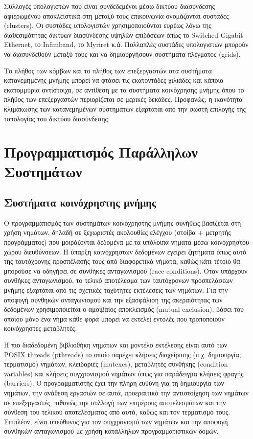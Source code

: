 Συλλογές υπολογιστών που είναι συνδεδεμένοι μέσω δικτύου διασύνδεσης αφιερωμένου αποκλειστικά στη μεταξύ τους επικοινωνία ονομάζονται συστάδες (clusters). Οι συστάδες υπολογιστών χρησιμοποιούνται ευρέως λόγω της διαθεσιμότητας δικτύων διασύνδεσης υψηλών επιδόσεων όπως το Switched Gigabit Ethernet, το Infiniband, το Myriret κ.ά. Πολλαπλές συστάδες υπολογιστών μπορούν να διασυνδεθούν μεταξύ τους και να δημιουργήσουν συστήματα πλέγματος (grids).

Το πλήθος των κόμβων και το πλήθος των επεξεργαστών στα συστήματα κατανεμημένης μνήμης μπορεί να φτάσει τις εκατοντάδες χιλιάδες και κάποια εκατομμύρια αντίστοιχα, σε αντίθεση με τα συστήματα κοινόχρησης μνήμης όπου το πλήθος των επεξεργαστών περιορίζεται σε μερικές δεκάδες. Προφανώς, η ικανότητα κλιμάκωσης των κατανεμημένων συστημάτων εξαρτάται από την σωστή επιλογής της τοπολογίας του δικτύου διασύνδεσης.


\section{Προγραμματισμός Παράλληλων Συστημάτων}

\subsection{Συστήματα κοινόχρηστης μνήμης}
\label{ssec:Shared Memory Programming}
Ο προγραμματισμός των συστημάτων κοινόχρηστης μνήμης συνήθως βασίζεται στη χρήση νημάτων, δηλαδή σε ξεχωριστές ακολουθίες ελέγχου (στοίβα + μετρητής προγράμματος) που μοιράζονται δεδομένα με τα υπόλοιπα  νήματα μέσω κοινόχρηστου χώρου διευθύνσεων. Η ύπαρξη κοινόχρηστων δεδομένων εγείρει ζητήματα όπως αυτό της ταυτόχρονης προσπέλασής τους από διαφορετικά νήματα, καθώς κάτι τέτοιο θα μπορούσε να οδηγήσει σε συνθήκες ανταγωνισμού (race conditions). Όταν υπάρχουν συνθήκες ανταγωνισμού, το τελικό αποτέλεσμα των ταυτόχρονων προσπελάσεων μνήμης εξαρτάται από τις σχετικές ταχύτητες εκτέλεσεις των νημάτων. Για την αποφυγή συνθηκών ανταγωνισμού και την εξασφάλιση της ακεραιότητας των δεδομένων χρησιμοποιείται ο αμοιβαίος αποκλεισμός (mutual exclusion), βάσει του οποίου μόνο ένα νήμα κάθε φορά μπορεί να εκτελεί εντολές που τροποποιούν κοινόχρηστες μεταβλητές.

Η πιο διαδεδομένη βιβλιοθήκη νημάτων και μοντέλο εκτέλεσης είναι αυτό των POSIX threads (pthreads) το οποίο παρέχει κλήσεις διαχείρισης (π.χ. δημιουργία, τερματισμό) νημάτων, κλειδαριές (mutexes), μεταβλητές συνθήκης (condition variables) και κλήσεις συγχρονισμού νημάτων όπως για παράδειγμα κλήσεις φραγής (barriers). Ο προγραμματιστής έχει την πλήρη ευθύνη για τη δημιουργία των νημάτων, την ανάθεση εργασιών σε αυτά, προεραιτικά την αντιστοίχηση των νημάτων σε επεξεργαστές, πιθανώς την συλλογή των επιμέρους αποτελεσμάτων και την σύνθεση του τελικού αποτελέσματος από αυτά, καθώς και τον τερματισμό τους. Επιπλέον, είναι υπεύθυνος για τον συγχρονισμό των νημάτων και την αποφυγή συνθηκών ανταγωνισμού με χρήση κατάλληλων προγραμματιστικών δομών.

